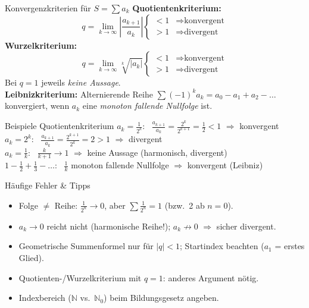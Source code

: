 \documentclass[a4paper, fontsize=7pt]{scrartcl}
\def\N{\mathbb{N}}  %
\begin{document}
\begin{mainbox}{Konvergenzkriterien für $S = \sum a_k$}
\textbf{Quotientenkriterium:}
$$q = \lim_{k\to\infty} \left|\frac{a_{k+1}}{a_k}\right|
\begin{cases} < 1 & \Rightarrow \text{konvergent} \\
> 1 & \Rightarrow \text{divergent} \end{cases}$$
\textbf{Wurzelkriterium:}
$$q = \lim_{k\to\infty} \sqrt[k]{|a_k|}
\begin{cases} < 1 & \Rightarrow \text{konvergent} \\
> 1 & \Rightarrow \text{divergent} \end{cases}$$
Bei $q = 1$ jeweils \emph{keine Aussage}.\\[2pt]
\textbf{Leibnizkriterium:} Alternierende Reihe
$\sum (-1)^k a_k = a_0 - a_1 + a_2 - \ldots$ konvergiert, wenn $a_k$ eine
\emph{monoton fallende Nullfolge} ist.
\end{mainbox}

\begin{subbox}{Beispiele Quotientenkriterium}
$a_k = \frac{1}{2^k}$: \
$\frac{a_{k+1}}{a_k} = \frac{2^k}{2^{k+1}} = \frac12 < 1$ $\Rightarrow$
konvergent\\
$a_k = 2^k$: \
$\frac{a_{k+1}}{a_k} = \frac{2^{k+1}}{2^k} = 2 > 1$ $\Rightarrow$ divergent\\
$a_k = \frac1k$: \ $\frac{k}{k+1} \to 1$ $\Rightarrow$ keine Aussage
(harmonisch, divergent)\\
$1 - \frac12 + \frac13 - \ldots$: \ $\frac1k$ monoton fallende Nullfolge
$\Rightarrow$ konvergent (Leibniz)
\end{subbox}

\begin{subbox}{Häufige Fehler \& Tipps}
\begin{itemize}
    \item Folge $\neq$ Reihe: $\frac{1}{2^n} \to 0$, aber
          $\sum \frac{1}{2^n} = 1$ (bzw.\ 2 ab $n=0$).
    \item $a_k \to 0$ reicht nicht (harmonische Reihe!); $a_k \not\to 0$
          $\Rightarrow$ sicher divergent.
    \item Geometrische Summenformel nur für $|q| < 1$; Startindex beachten
          ($a_1$ = erstes Glied).
    \item Quotienten-/Wurzelkriterium mit $q = 1$: anderes Argument nötig.
    \item Indexbereich ($\N$ vs.\ $\N_0$) beim Bildungsgesetz angeben.
\end{itemize}
\end{subbox}
\end{document}
